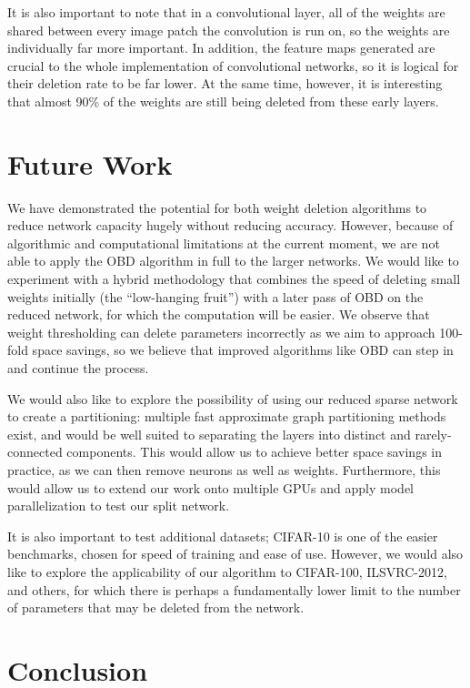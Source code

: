\documentclass[10pt,twocolumn,letterpaper]{article}
\begin{document}
It is also important to note that in a convolutional layer, all of the weights are shared between every image patch the convolution is run on, so the weights are individually far more important.
In addition, the feature maps generated are crucial to the whole implementation of convolutional networks, so it is logical for their deletion rate to be far lower.
At the same time, however, it is interesting that almost 90\% of the weights are still being deleted from these early layers.
\section{Future Work}
We have demonstrated the potential for both weight deletion algorithms to reduce network capacity hugely without reducing accuracy.
However, because of algorithmic and computational limitations at the current moment, we are not able to apply the OBD algorithm in full to the larger networks.
We would like to experiment with a hybrid methodology that combines the speed of deleting small weights initially (the ``low-hanging fruit'') with a later pass of OBD on the reduced network, for which the computation will be easier.
We observe that weight thresholding can delete parameters incorrectly as we aim to approach 100-fold space savings, so we believe that improved algorithms like OBD can step in and continue the process.

We would also like to explore the possibility of using our reduced sparse network to create a partitioning: multiple fast approximate graph partitioning methods exist, and would be well suited to separating the layers into distinct and rarely-connected components.
This would allow us to achieve better space savings in practice, as we can then remove neurons as well as weights.
Furthermore, this would allow us to extend our work onto multiple GPUs and apply model parallelization to test our split network.

It is also important to test additional datasets; CIFAR-10 is one of the easier benchmarks, chosen for speed of training and ease of use.
However, we would also like to explore the applicability of our algorithm to CIFAR-100, ILSVRC-2012, and others, for which there is perhaps a fundamentally lower limit to the number of parameters that may be deleted from the network.

\section{Conclusion}
{\small

\nocite{*}

}
\end{document}
